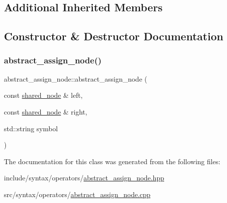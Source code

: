 \subsection*{Additional Inherited Members}


\subsection{Constructor \& Destructor Documentation}
\mbox{\label{classjawe_1_1abstract__assign__node_ace18ba77e7a0d85b3b9c475062a8fec0}} 
\subsubsection{\texorpdfstring{abstract\+\_\+assign\+\_\+node()}{abstract\_assign\_node()}}
{\footnotesize\ttfamily abstract\+\_\+assign\+\_\+node\+::abstract\+\_\+assign\+\_\+node (\begin{DoxyParamCaption}\item[{const \hyperlink{namespacejawe_a3f307481d921b6cbb50cc8511fc2b544}{shared\+\_\+node} \&}]{left,  }\item[{const \hyperlink{namespacejawe_a3f307481d921b6cbb50cc8511fc2b544}{shared\+\_\+node} \&}]{right,  }\item[{std\+::string}]{symbol }\end{DoxyParamCaption})}



The documentation for this class was generated from the following files\+:\begin{DoxyCompactItemize}
\item 
include/syntax/operators/\hyperlink{abstract__assign__node_8hpp}{abstract\+\_\+assign\+\_\+node.\+hpp}\item 
src/syntax/operators/\hyperlink{abstract__assign__node_8cpp}{abstract\+\_\+assign\+\_\+node.\+cpp}\end{DoxyCompactItemize}
